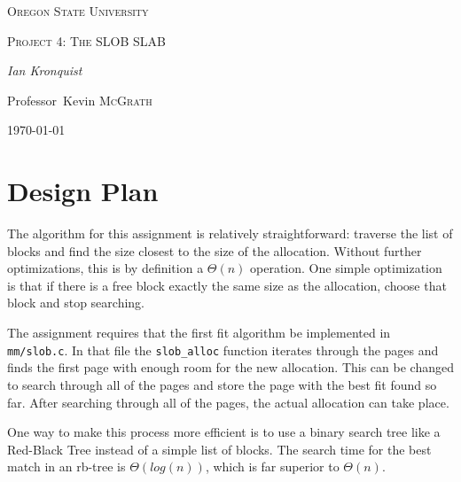 \documentclass[10pt,conference,draftclsnofoot,onecolumn]{IEEEtran}
\begin{document}
\begin{titlepage}
    \centering
    {\scshape\LARGE Oregon State University \par}
    \vspace{1cm}
    {\scshape\Large Project 4: The SLOB SLAB \par}
    \vspace{2cm}
    {\Large\itshape Ian Kronquist \par}
    \vfill
    \par
    Professor~Kevin \textsc{McGrath}

    \vfill

    {\large \today\par}
\end{titlepage}


\author{
}

\bigskip

\section{Design Plan}
The algorithm for this assignment is relatively straightforward: traverse the list of blocks and find the size closest to the size of the allocation. Without further optimizations, this is by definition a $\Theta(n)$ operation. One simple optimization is that if there is a free block exactly the same size as the allocation, choose that block and stop searching.

The assignment requires that the first fit algorithm be implemented in \texttt{mm/slob.c}. In that file the \texttt{slob\_alloc} function iterates through the pages and finds the first page with enough room for the new allocation. This can be changed to search through all of the pages and store the page with the best fit found so far. After searching through all of the pages, the actual allocation can take place.

One way to make this process more efficient is to use a binary search tree like a Red-Black Tree instead of a simple list of blocks. The search time for the best match in an rb-tree is $\Theta(log(n))$, which is far superior to $\Theta(n)$.

\clearpage
\printbibliography

\clearpage

\begin{appendices}


\end{appendices}
\end{document}
